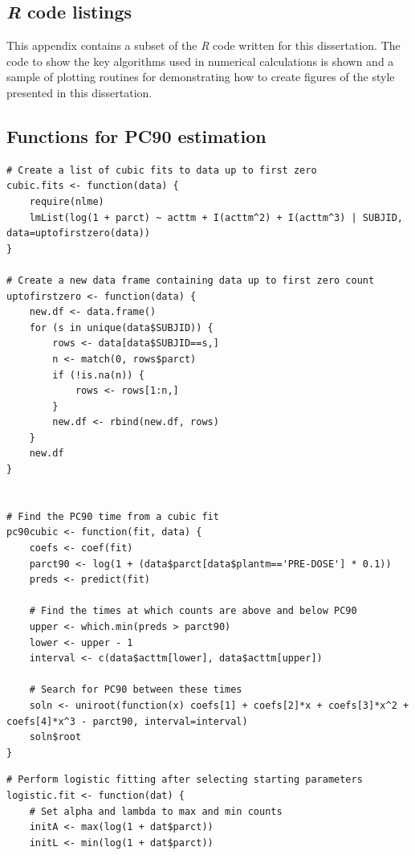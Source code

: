 \begin{singlespace}
\chapter{\emph{R} code listings}
\lstset{numberstyle=\small,
frame=single,
framesep=6pt,
tabsize=2,
basicstyle=\small\ttfamily,
showstringspaces=false,
columns = fullflexible,
language=R,
breaklines=true,
showstringspaces=false,
lineskip=-1pt}

This appendix contains a subset of the \emph{R} code written for this dissertation. The code to show the key algorithms used in numerical calculations is shown and a sample of plotting routines for demonstrating how to create figures of the style presented in this dissertation.
\section{Functions for PC90 estimation}
\begin{lstlisting}[caption=Functions to find PC90 by cubic regression,label=R:cubics]
# Create a list of cubic fits to data up to first zero
cubic.fits <- function(data) {
	require(nlme)
	lmList(log(1 + parct) ~ acttm + I(acttm^2) + I(acttm^3) | SUBJID, data=uptofirstzero(data))
}

# Create a new data frame containing data up to first zero count
uptofirstzero <- function(data) {
	new.df <- data.frame()
	for (s in unique(data$SUBJID)) {
		rows <- data[data$SUBJID==s,]
		n <- match(0, rows$parct)
		if (!is.na(n)) {
			rows <- rows[1:n,]
		}
		new.df <- rbind(new.df, rows)
	}
	new.df
}


# Find the PC90 time from a cubic fit
pc90cubic <- function(fit, data) {
	coefs <- coef(fit)
	parct90 <- log(1 + (data$parct[data$plantm=='PRE-DOSE'] * 0.1))
	preds <- predict(fit)
	
	# Find the times at which counts are above and below PC90 
	upper <- which.min(preds > parct90)
	lower <- upper - 1
	interval <- c(data$acttm[lower], data$acttm[upper])

	# Search for PC90 between these times
	soln <- uniroot(function(x) coefs[1] + coefs[2]*x + coefs[3]*x^2 + coefs[4]*x^3 - parct90, interval=interval)
	soln$root
}
\end{lstlisting}

\begin{lstlisting}[caption=Functions to find PC90 by logistic regression,label=R:logistics]
# Perform logistic fitting after selecting starting parameters
logistic.fit <- function(dat) {
	# Set alpha and lambda to max and min counts
	initA <- max(log(1 + dat$parct))
	initL <- min(log(1 + dat$parct))


\end{lstlisting}
\end{singlespace}
